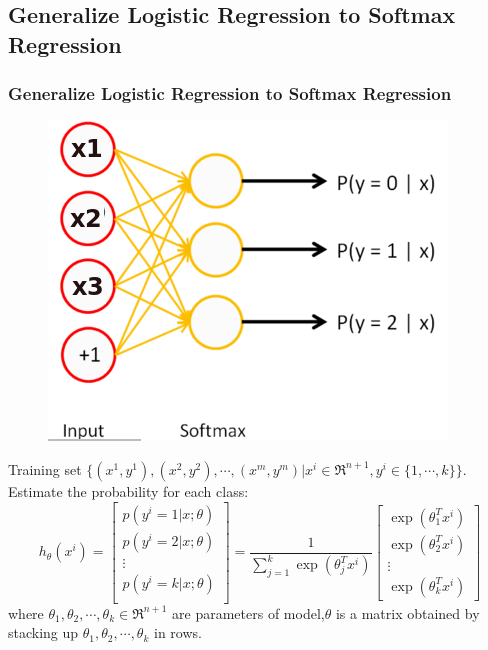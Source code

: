 \documentclass{beamer}
\begin{document}
\begin{CJK*}{UTF8}{gbsn}
\subsection{Generalize Logistic Regression to Softmax Regression}
\begin{frame}\frametitle{Generalize Logistic Regression to Softmax Regression}
\begin{figure}
\centering
\includegraphics[scale=0.25]{images/Softmax_Classifier}
\end{figure}
Training set $\{(x^1,y^1),(x^2,y^2),\cdots,(x^m,y^m)|x^i\in\Re^{n+1},y^i\in\{1,\cdots,k\}\}$.\\
Estimate the probability for each class:
\begin{equation}\label{eq:softmax_output}
h_\theta(x^i)=\left[\begin{array}{c}
p(y^i=1|x;\theta)\\
p(y^i=2|x;\theta)\\
\vdots\\
p(y^i=k|x;\theta)\\
\end{array}\right]
=\frac{1}{\sum_{j=1}^k\exp(\theta_j^Tx^i)}\left[\begin{array}{c}
\exp(\theta_1^Tx^i)\\
\exp(\theta_2^Tx^i)\\
\vdots\\
\exp(\theta_k^Tx^i)
\end{array}\right]
\end{equation}
where $\theta_1,\theta_2,\cdots,\theta_k\in\Re^{n+1}$ are parameters of model,$\theta$ is a matrix obtained by stacking up $\theta_1,\theta_2,\cdots,\theta_k$ in rows.
\end{frame}


\end{CJK*}
\end{document}
